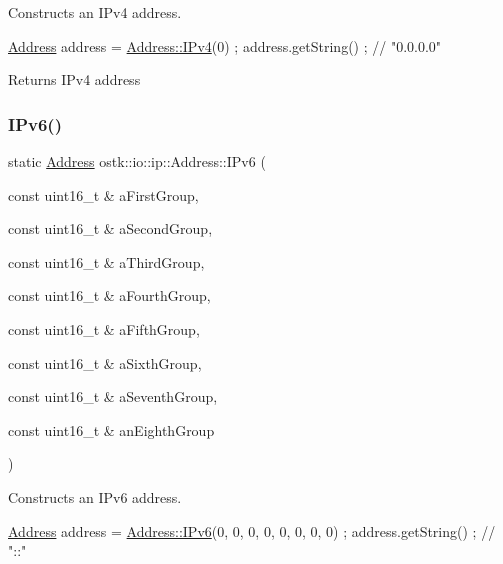 Constructs an I\+Pv4 address. 


\begin{DoxyCode}
\hyperlink{classostk_1_1io_1_1ip_1_1_address_a4118f42388b11fb003c9fb782f4ca04f}{Address} address = \hyperlink{classostk_1_1io_1_1ip_1_1_address_a495956892a4815139c94377c0267125d}{Address::IPv4}(0) ;
address.getString() ; \textcolor{comment}{// "0.0.0.0"}
\end{DoxyCode}


\begin{DoxyReturn}{Returns}
I\+Pv4 address 
\end{DoxyReturn}
\mbox{\label{classostk_1_1io_1_1ip_1_1_address_a3f41fa50dd97310ed8d88e5097b9c038}} 
\subsubsection{\texorpdfstring{I\+Pv6()}{IPv6()}}
{\footnotesize\ttfamily static \hyperlink{classostk_1_1io_1_1ip_1_1_address}{Address} ostk\+::io\+::ip\+::\+Address\+::\+I\+Pv6 (\begin{DoxyParamCaption}\item[{const uint16\+\_\+t \&}]{a\+First\+Group,  }\item[{const uint16\+\_\+t \&}]{a\+Second\+Group,  }\item[{const uint16\+\_\+t \&}]{a\+Third\+Group,  }\item[{const uint16\+\_\+t \&}]{a\+Fourth\+Group,  }\item[{const uint16\+\_\+t \&}]{a\+Fifth\+Group,  }\item[{const uint16\+\_\+t \&}]{a\+Sixth\+Group,  }\item[{const uint16\+\_\+t \&}]{a\+Seventh\+Group,  }\item[{const uint16\+\_\+t \&}]{an\+Eighth\+Group }\end{DoxyParamCaption})\hspace{0.3cm}{\ttfamily [static]}}



Constructs an I\+Pv6 address. 


\begin{DoxyCode}
\hyperlink{classostk_1_1io_1_1ip_1_1_address_a4118f42388b11fb003c9fb782f4ca04f}{Address} address = \hyperlink{classostk_1_1io_1_1ip_1_1_address_a3f41fa50dd97310ed8d88e5097b9c038}{Address::IPv6}(0, 0, 0, 0, 0, 0, 0, 0) ;
address.getString() ; \textcolor{comment}{// "::"}
\end{DoxyCode}


